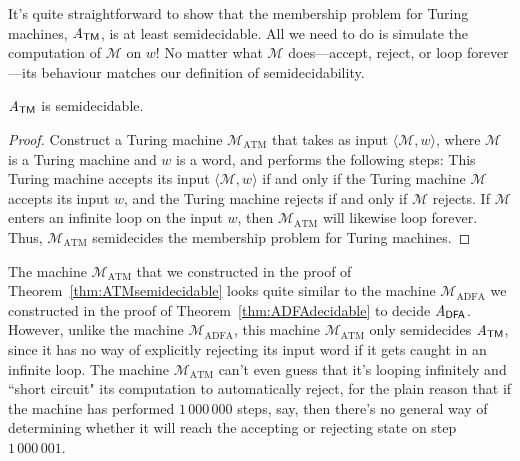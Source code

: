 It's quite straightforward to show that the membership problem for Turing machines, $\mathit{A}_{\textsf{TM}}$, is at least semidecidable. All we need to do is simulate the computation of $\mathcal{M}$ on $w$! No matter what $\mathcal{M}$ does---accept, reject, or loop forever---its behaviour matches our definition of semidecidability.

\begin{theorem}\label{thm:ATMsemidecidable}
$\mathit{A}_{\textsf{TM}}$ is semidecidable.

\begin{proof}
Construct a Turing machine $\mathcal{M}_{\mathrm{ATM}}$ that takes as input $\langle \mathcal{M}, w \rangle$, where $\mathcal{M}$ is a Turing machine and $w$ is a word, and performs the following steps:
This Turing machine accepts its input $\langle \mathcal{M}, w \rangle$ if and only if the Turing machine $\mathcal{M}$ accepts its input $w$, and the Turing machine rejects if and only if $\mathcal{M}$ rejects. If $\mathcal{M}$ enters an infinite loop on the input $w$, then $\mathcal{M}_{\mathrm{ATM}}$ will likewise loop forever. Thus, $\mathcal{M}_{\mathrm{ATM}}$ semidecides the membership problem for Turing machines.
\end{proof}
\end{theorem}

The machine $\mathcal{M}_{\mathrm{ATM}}$ that we constructed in the proof of Theorem~\ref{thm:ATMsemidecidable} looks quite similar to the machine $\mathcal{M}_{\mathrm{ADFA}}$ we constructed in the proof of Theorem~\ref{thm:ADFAdecidable} to decide $\mathit{A}_{\textsf{DFA}}$. However, unlike the machine $\mathcal{M}_{\mathrm{ADFA}}$, this machine $\mathcal{M}_{\mathrm{ATM}}$ only semidecides $\mathit{A}_{\textsf{TM}}$, since it has no way of explicitly rejecting its input word if it gets caught in an infinite loop. The machine $\mathcal{M}_{\mathrm{ATM}}$ can't even guess that it's looping infinitely and ``short circuit" its computation to automatically reject, for the plain reason that if the machine has performed $1\,000\,000$ steps, say, then there's no general way of determining whether it will reach the accepting or rejecting state on step $1\,000\,001$.

